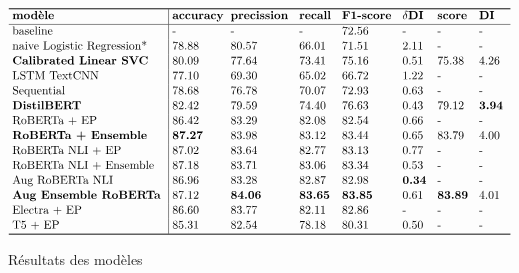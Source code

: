 \begin{table}[ht!]
$$\vbox{
\offinterlineskip
\halign{
\strut
\vrule height1ex depth1ex width0px #
&\kern3pt #\hfil\kern3pt\vrule
&\kern3pt #\hfil\kern3pt
&\kern3pt #\hfil\kern3pt
&\kern3pt #\hfil\kern3pt
&\kern3pt #\hfil\kern3pt
&\kern3pt #\hfil\kern3pt
&\kern3pt #\hfil\kern3pt
&\kern3pt #\hfil\kern3pt
\cr
\noalign{\hrule height0.8pt}
 & \textbf{modèle}            & \textbf{accuracy}& \textbf{precission} & \textbf{recall} & \textbf{F1-score} & $\delta$\textbf{DI} & \textbf{score}  & \textbf{DI}  \cr
\noalign{\hrule}
 & baseline                   & -        & -          & -      & 72.56    & -       & -   & -                       \cr
 & naive Logistic Regression* & 78.88    & 80.57      & 66.01  & 71.51    & 2.11    & -   & -                       \cr
 & \textbf{Calibrated Linear SVC}  & 80.09    & 77.64      & 73.41  & 75.16    & 0.51    & 75.38 & 4.26                  \cr
 & LSTM TextCNN               & 77.10    & 69.30      & 65.02  & 66.72    & 1.22    & -   & -                       \cr
 & Sequential                 & 78.68    & 76.78      & 70.07  & 72.93    & 0.63    & -   & -                       \cr
 & \textbf{DistilBERT}                 & 82.42    & 79.59      & 74.40  & 76.63    & 0.43    & 79.12 & \textbf{3.94}         \cr
 & RoBERTa + EP               & 86.42    & 83.29      & 82.08  & 82.54    & 0.66    & -   & -                       \cr
 & \textbf{RoBERTa + Ensemble}         & \textbf{87.27} & 83.98      & 83.12  & 83.44    & 0.65    & 83.79  & 4.00           \cr
 & RoBERTa NLI + EP           & 87.02    & 83.64      & 82.77  & 83.13    & 0.77    & -   & -                      \cr
 & RoBERTa NLI + Ensemble     & 87.18    & 83.71      & 83.06  & 83.34    & 0.53    & -   & -                       \cr
 & Aug RoBERTa NLI            & 86.96    & 83.28      & 82.87  & 82.98    & \textbf{0.34} & -  & -                           \cr
 & \textbf{Aug Ensemble RoBERTa}       & 87.12    & \textbf{84.06} & \textbf{83.65} & \textbf{83.85} & 0.61  & \textbf{83.89}    & 4.01    \cr
 & Electra + EP               & 86.60    & 83.77      & 82.11  & 82.86    & -       & -   & -                     \cr
 & T5 + EP                    & 85.31    & 82.54      & 78.18  & 80.31    & 0.50    & -   & -                     \cr
\noalign{\hrule height0.8pt}
}
}$$
\caption{Résultats des modèles}
\label{table:1}
\end{table}


